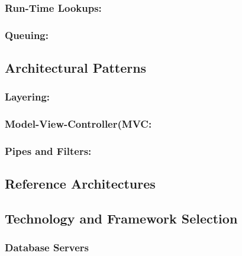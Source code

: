 \documentclass[12pt]{article}
\begin{document}
	\subsubsection {Run-Time Lookups:}


	\subsubsection {Queuing:}



	\subsection{Architectural Patterns}


	\subsubsection{Layering:} 



	\subsubsection{Model-View-Controller(MVC:}



	\subsubsection{Pipes and Filters:}



	\subsection{Reference Architectures}



	\subsection{Technology and Framework Selection}



	\subsubsection{Database Servers}
\end{document}
